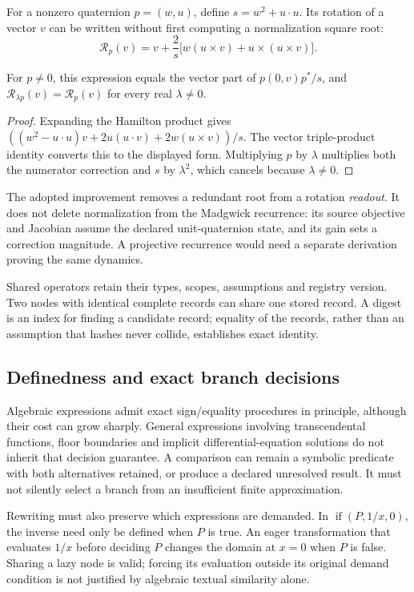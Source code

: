 For a nonzero quaternion $p=(w,u)$, define $s=w^2+u\cdot u$. Its rotation of a
vector $v$ can be written without first computing a normalization square root:
\[
 \mathcal R_p(v)=v+\frac{2}{s}
        \bigl[w(u\times v)+u\times(u\times v)\bigr].
\]
\begin{proposition}
For $p\ne0$, this expression equals the vector part of
$p(0,v)p^*/s$, and $\mathcal R_{\lambda p}(v)=\mathcal R_p(v)$ for every real
$\lambda\ne0$.
\end{proposition}
\begin{proof}
Expanding the Hamilton product gives
$((w^2-u\cdot u)v+2u(u\cdot v)+2w(u\times v))/s$.
The vector triple-product identity converts this to the displayed form.
Multiplying $p$ by $\lambda$ multiplies both the numerator correction and $s$
by $\lambda^2$, which cancels because $\lambda\ne0$.
\end{proof}

The adopted improvement removes a redundant root from a rotation \emph{readout}.
It does not delete normalization from the Madgwick recurrence: its source
objective and Jacobian assume the declared unit-quaternion state, and its gain
sets a correction magnitude. A projective recurrence would need a separate
derivation proving the same dynamics.

Shared operators retain their types, scopes, assumptions and registry version.
Two nodes with identical complete records can share one stored record. A digest
is an index for finding a candidate record; equality of the records, rather than
an assumption that hashes never collide, establishes exact identity.

\subsection{Definedness and exact branch decisions}
Algebraic expressions admit exact sign/equality procedures in principle, although
their cost can grow sharply. General expressions involving transcendental
functions, floor boundaries and implicit differential-equation solutions do not
inherit that decision guarantee. A comparison can remain a symbolic predicate
with both alternatives retained, or produce a declared unresolved result. It
must not silently select a branch from an insufficient finite approximation.

Rewriting must also preserve which expressions are demanded. In
$\operatorname{if}(P,1/x,0)$, the inverse need only be defined when $P$ is true.
An eager transformation that evaluates $1/x$ before deciding $P$ changes the
domain at $x=0$ when $P$ is false. Sharing a lazy node is valid; forcing its
evaluation outside its original demand condition is not justified by algebraic
textual similarity alone.

